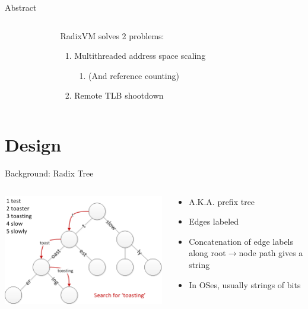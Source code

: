 \documentclass[aspectratio=169]{beamer}
\newcommand{\bi}{\begin{itemize}}
\newcommand{\ei}{\end{itemize}}
\newcommand{\bn}{\begin{enumerate}}
\newcommand{\en}{\end{enumerate}}
\begin{document}
\begin{frame}{Abstract}
  \begin{columns}[T]
    \begin{column}{0.3\textwidth}
    \end{column}
    \begin{column}{0.4\textwidth}
      RadixVM solves 2 problems:
      \bn
    \item {Multithreaded address space scaling}
      \bn
    \item (And reference counting)
      \en
    \item Remote TLB shootdown
      \en
    \end{column}
    \begin{column}{0.3\textwidth}
    \end{column}
  \end{columns}
\end{frame}

\section{Design}

\begin{frame}{Background: Radix Tree}
  \begin{columns}[T]
    \begin{column}{0.5\textwidth}
      \begin{center}
        \includegraphics[scale=0.6]{./figures/Patricia_trie.png}
      \end{center}
    \end{column}
    \begin{column}{0.5\textwidth}
      \bi
    \item A.K.A. prefix tree
      \pause
    \item Edges labeled
      \pause
    \item Concatenation of edge labels along root$\rightarrow$node path gives a string
      \pause
    \item In OSes, usually strings of bits
      \ei
    \end{column}
  \end{columns}
\end{frame}
\end{document}
